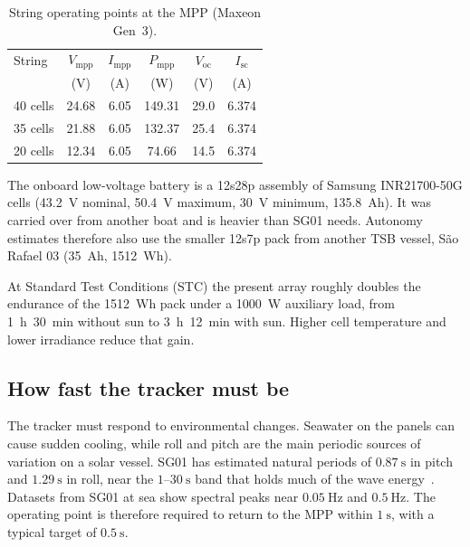 \documentclass[conference]{IEEEtran}
\begin{document}
    \begin{table}[!t]
        \centering
        \caption{String operating points at the MPP (Maxeon Gen~3).}
        \label{tab:pv}
        \footnotesize
        \setlength{\tabcolsep}{3.5pt}
        \begin{tabular}{lccccc}
            \toprule
            String & $V_{\mathrm{mpp}}$ & $I_{\mathrm{mpp}}$ & $P_{\mathrm{mpp}}$ & $V_{\mathrm{oc}}$ & $I_{\mathrm{sc}}$ \\
            & (V) & (A) & (W) & (V) & (A) \\
            \midrule
            40 cells & 24.68 & 6.05 & 149.31 & 29.0 & 6.374 \\
            35 cells & 21.88 & 6.05 & 132.37 & 25.4 & 6.374 \\
            20 cells & 12.34 & 6.05 & 74.66 & 14.5 & 6.374 \\
            \bottomrule
        \end{tabular}
    \end{table}

    The onboard low-voltage battery is a 12s28p assembly of Samsung INR21700-50G cells (43.2~V nominal, 50.4~V maximum, 30~V minimum, 135.8~Ah). It was carried over from another boat and is heavier than SG01 needs. Autonomy estimates therefore also use the smaller 12s7p pack from another TSB vessel, São Rafael 03 (35~Ah, 1512~Wh). 

    At Standard Test Conditions (STC) the present array roughly doubles the endurance of the 1512~Wh pack under a 1000~W auxiliary load, from 1~h~30~min without sun to 3~h~12~min with sun. Higher cell temperature and lower irradiance reduce that gain.

    \subsection{How fast the tracker must be}
    The tracker must respond to environmental changes. Seawater on the panels can cause sudden cooling, while roll and pitch are the main periodic sources of variation on a solar vessel. SG01 has estimated natural periods of $0.87~\mathrm{s}$ in pitch and $1.29~\mathrm{s}$ in roll, near the $1$--$30~\mathrm{s}$ band that holds much of the wave energy~\cite{newfrontiers2018}. Datasets from SG01 at sea show spectral peaks near $0.05~\mathrm{Hz}$ and $0.5~\mathrm{Hz}$. The operating point is therefore required to return to the MPP within $1~\mathrm{s}$, with a typical target of $0.5~\mathrm{s}$.
\end{document}
